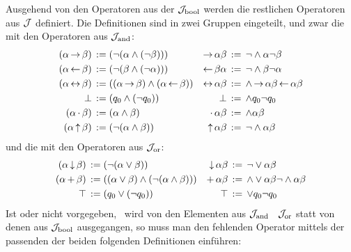 Ausgehend von den Operatoren aus der  $\mathcal{J}_{\mathrm{bool}}$ werden die restlichen Operatoren aus $\mathcal{J}$ definiert. Die Definitionen sind in zwei Gruppen eingeteilt, und zwar die mit den Operatoren aus $\mathcal{J}_{\mathrm{and}}$:
\begin{align}
	(\alpha \limp \beta) &\;\defeq\; (\lnot (\alpha \land  (\lnot \beta))) &
	\limp \alpha \beta   &\;\defeq\;  \lnot    \land \alpha \lnot \beta
	\label{def:imp}
	\\
	(\alpha \lrep \beta) &\;\defeq\; (\lnot (\beta \land  (\lnot \alpha))) &
	\lrep \beta  \alpha  &\;\defeq\;  \lnot    \land \beta \lnot \alpha
	\label{def:rep}
	\\
	(\alpha\lequiv\beta) &\;\defeq\;((\alpha\limp\beta)\land(\alpha\lrep\beta))&
	\lequiv\alpha \beta  &\;\defeq\;\land \limp \alpha \beta \lrep \alpha \beta
	\label{def:equiv}
	\\
	\lfalse              &\;\defeq\; (\alvar_0 \land (\lnot \alvar_0)) &
	\lfalse              &\;\defeq\;  \land \alvar_0  \lnot \alvar_0   \label{def:false}
	\\
	(\alpha \lmult \beta)&\;\defeq\; (\alpha \land \beta)          &
	\lmult \alpha  \beta &\;\defeq\;  \land \alpha \beta        \label{def:mult}
	\\
	(\alpha \lnand \beta)&\;\defeq\; (\lnot (\alpha \land \beta )) &
	\lnand \alpha  \beta &\;\defeq\;  \lnot  \land \alpha \beta \label{def:nand}
\end{align}
und die mit den Operatoren aus $\mathcal{J}_{\mathrm{or}}$:
\begin{align}
	(\alpha \operatorname{\downarrow} \beta) &\;\operatorname{:\!\operatorname{=}}\; (\lnot (\alpha \lor \beta))   &
	\operatorname{\downarrow} \alpha  \beta  & \;\operatorname{:\!\operatorname{=}}\;  \lnot  \lor \alpha \beta \label{def:nor}
	\\
	(\alpha\operatorname{+}\beta)&\;\operatorname{:\!\operatorname{=}}\;((\alpha\lor\beta)\land(\lnot(\alpha\land\beta)))&
	\operatorname{+}\alpha \beta &\;\operatorname{:\!\operatorname{=}}\;  \land \lor\alpha\beta \lnot \land\alpha\beta
	\label{def:add}
	\\
	\top & \;\operatorname{:\!\operatorname{=}}\; (q_0 \lor (\lnot q_0)) &
	\top & \;\operatorname{:\!\operatorname{=}}\;  \lor q_0  \lnot q_0
	\label{def:true}
\end{align}
%
Ist \symqt{$\lor$} oder \symqt{$\land$} nicht vorgegeben, \textdh\ wird von den Elementen aus $\mathcal{J}_{\mathrm{and}}$ \textbzgl\ $\mathcal{J}_{\mathrm{or}}$ statt von denen aus $\mathcal{J}_{\mathrm{bool}}$ ausgegangen, so muss man den fehlenden Operator mittels der passenden der beiden folgenden Definitionen einführen:
